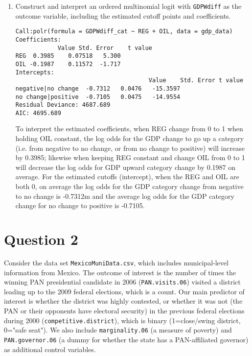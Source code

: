 \documentclass[12pt,letterpaper]{article}
\begin{document}
\begin{enumerate}
	\item Construct and interpret an ordered multinomial logit with \texttt{GDPWdiff} as the outcome variable, including the estimated cutoff points and coefficients.
	 
	\begin{lstlisting}		
Call:polr(formula = GDPWdiff_cat ~ REG + OIL, data = gdp_data)
Coefficients:      
			Value Std. Error    t value
REG  0.3985    0.07518   5.300
OIL -0.1987    0.11572  -1.717
Intercepts:                   
				                      Value    Std. Error t value 
negative|no change  -0.7312   0.0476   -15.3597
no change|positive  -0.7105   0.0475   -14.9554
Residual Deviance: 4687.689 
AIC: 4695.689 
\end{lstlisting}	
To interpret the estimated coefficients, when REG change from 0 to 1 when holding OIL constant, the log odds for the GDP change to go up a category (i.e. from negative to no change, or from no change to positive) will increase by 0.3985; likewise when keeping REG constant and change OIL from 0 to 1 will decrease the log odds for GDP upward category change  by 0.1987 on average. For the estimated cutoffs (intercept), when the REG and OIL are both 0, on average the log odds for the GDP category change from negative to no change is -0.7312m and the average log odds for the GDP category change for no change to positive is -0.7105. 
\end{enumerate}

\section*{Question 2} 
\vspace{.25cm}

\noindent Consider the data set \texttt{MexicoMuniData.csv}, which includes municipal-level information from Mexico. The outcome of interest is the number of times the winning PAN presidential candidate in 2006 (\texttt{PAN.visits.06}) visited a district leading up to the 2009 federal elections, which is a count. Our main predictor of interest is whether the district was highly contested, or whether it was not (the PAN or their opponents have electoral security) in the previous federal elections during 2000 (\texttt{competitive.district}), which is binary (1=close/swing district, 0="safe seat"). We also include \texttt{marginality.06} (a measure of poverty) and \texttt{PAN.governor.06} (a dummy for whether the state has a PAN-affiliated governor) as additional control variables. 
\end{document}
